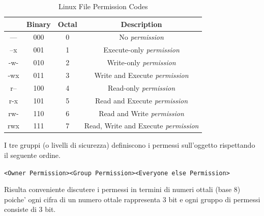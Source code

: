\begin{table}[]
\centering
\begin{tabular}{cccc}
\hline
\rowcolor[HTML]{C0C0C0} 
\multicolumn{1}{c|}{\cellcolor[HTML]{C0C0C0}\textbf{Permissions}} &
\multicolumn{1}{c|}{\cellcolor[HTML]{C0C0C0}\textbf{Binary}} &
\multicolumn{1}{c|}{\cellcolor[HTML]{C0C0C0}\textbf{Octal}} &
\multicolumn{1}{c}{\cellcolor[HTML]{C0C0C0}\textbf{Description}} \\ \hline
--- & 000 & 0 & No \emph{permission}                      \\ \hline
--x & 001 & 1 & Execute-only \emph{permission}            \\ \hline
-w- & 010 & 2 & Write-only \emph{permission}              \\ \hline
-wx & 011 & 3 & Write and Execute \emph{permission}       \\ \hline
r-- & 100 & 4 & Read-only \emph{permission}               \\ \hline
r-x & 101 & 5 & Read and Execute \emph{permission}        \\ \hline
rw- & 110 & 6 & Read and Write \emph{permission}          \\ \hline
rwx & 111 & 7 & Read, Write and Execute \emph{permission} \\ \hline
\end{tabular}
\caption{Linux File Permission Codes}
\end{table}
I tre gruppi (o livelli di sicurezza) definiscono i permessi sull'oggetto rispettando il seguente ordine.
\begin{center}
	\texttt{<Owner Permission><Group Permission><Everyone else Permission>}
\end{center}
Risulta conveniente discutere i permessi in termini di numeri ottali (base 8) poiche' ogni cifra di un numero ottale rappresenta 3 bit e ogni gruppo di permessi consiste di 3 bit.

